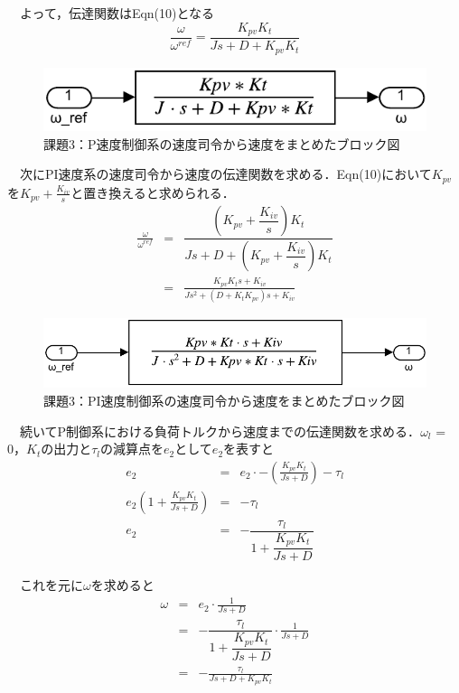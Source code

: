 　よって，伝達関数はEqn(10)となる
\begin{equation}
    \frac{\omega}{\omega^{ref}} = \frac{K_{pv} K_t}{Js + D + K_{pv} K_t}
\end{equation}

\begin{figure}[H]
    \centering
    \includegraphics[]{./fig/3_P_ans.pdf}
    \caption{課題3：P速度制御系の速度司令から速度をまとめたブロック図}
\end{figure}

　次にPI速度系の速度司令から速度の伝達関数を求める．Eqn(10)において$K_{pv}$を$K_{pv}+\frac{K_{iv}}{s}$と置き換えると求められる．
\begin{eqnarray}
    \frac{\omega}{\omega^{ref}} &=& \dfrac{\left(K_{pv}+\dfrac{K_{iv}}{s}\right)  K_t}{Js + D + \left(K_{pv}+\dfrac{K_{iv}}{s}\right) K_t} \nonumber \\
                                &=& \frac{K_{pv}K_ts + K_{iv}}{Js^2 + \left(D+K_tK_{pv}\right)s + K_{iv}}
\end{eqnarray}

\begin{figure}[H]
    \centering
    \includegraphics[]{./fig/3_PI_ans.pdf}
    \caption{課題3：PI速度制御系の速度司令から速度をまとめたブロック図}
\end{figure}

　続いてP制御系における負荷トルクから速度までの伝達関数を求める．$\omega_l$ = 0，$K_t$の出力と$\tau_l$の減算点を$e_2$として$e_2$を表すと
\begin{eqnarray}
    e_2 &=& e_2 \cdot - \left(\frac{K_{pv}K_t}{Js + D}\right) -\tau_l \nonumber \\
    e_2\left(1 + \frac{K_{pv}K_t}{Js + D}\right) &=& -\tau_l \nonumber \\
    e_2 &=& -\dfrac{\tau_l}{1 + \dfrac{K_{pv}K_t}{Js + D}} \nonumber
\end{eqnarray}

　これを元に$\omega$を求めると
\begin{eqnarray}
    \omega &=& e_2 \cdot \frac{1}{Js + D} \nonumber \\
           &=& -\dfrac{\tau_l}{1 + \dfrac{K_{pv}K_t}{Js + D}} \cdot \frac{1}{Js + D} \nonumber \\
           &=& -\frac{\tau_l}{Js + D + K_{pv}K_t} \nonumber
\end{eqnarray}

